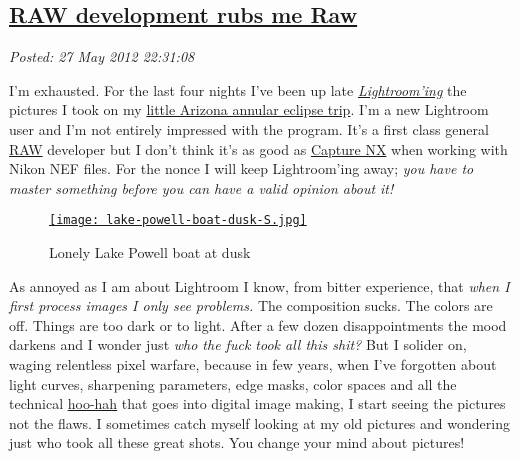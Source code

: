 %

\subsection*{\href{http://bakerjd99.wordpress.com/2012/05/27/raw-development-rubs-me-raw/}{RAW development rubs me Raw}}


\noindent\emph{Posted: 27 May 2012 22:31:08}
\vspace{6pt}

I'm exhausted. For the last four nights I've been up late
\emph{\href{http://www.adobe.com/products/photoshop-lightroom.html}{Lightroom'ing}}
the pictures I took on my
\href{http://conceptcontrol.smugmug.com/Trips/USA-and-Canada/Arizona-Toodling-1/7475075\_MrjqMc}{little
Arizona annular eclipse trip}. I'm a new Lightroom user and I'm not
entirely impressed with the program. It's a first class general
\href{http://en.wikipedia.org/wiki/Raw\_image\_format}{RAW} developer
but I don't think it's as good as
\href{http://www.capturenx.com/en/index.html}{Capture NX} when working
with Nikon NEF files. For the nonce I will keep Lightroom'ing away;
\emph{you have to master something before you can have a valid opinion
about it!}



\captionsetup[figure]{labelformat=empty}
\begin{figure}[htbp]
\centering
\href{http://conceptcontrol.smugmug.com/Trips/USA-and-Canada/Arizona-Toodling-1/7475075\_MrjqMc}{\texttt{[image: lake-powell-boat-dusk-S.jpg]}}
\caption{Lonely Lake Powell boat at dusk}
\label{fig:2865X0}
\end{figure}


As annoyed as I am about Lightroom I know, from bitter experience, that
\emph{when I first process images I only see problems.} The composition
sucks. The colors are off. Things are too dark or to light. After a few
dozen disappointments the mood darkens and I wonder just \emph{who the
fuck took all this shit?} But I solider on, waging relentless pixel
warfare, because in few years, when I've forgotten about light curves,
sharpening parameters, edge masks, color spaces and all the technical
\href{http://www.thefreedictionary.com/hoo-ha}{hoo-hah} that goes into
digital image making, I start seeing the pictures not the flaws. I
sometimes catch myself looking at my old pictures and wondering just who
took all these great shots. You change your mind about pictures!

